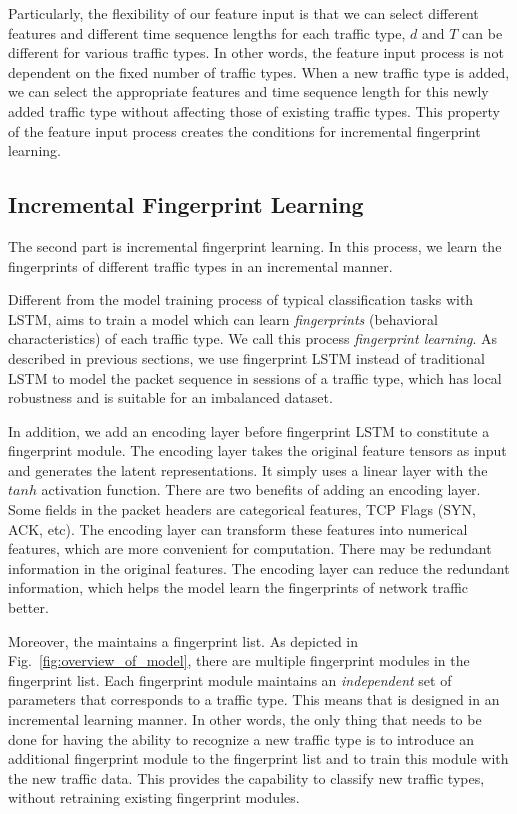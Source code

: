 Particularly, the flexibility of our feature input is that we can select different features and different time sequence lengths for each traffic type, \ie $d$ and $T$ can be different for various traffic types.  
In other words, the feature input process is not dependent on the fixed number of traffic types. 
When a new traffic type is added, we can select the appropriate features and time sequence length for this newly added traffic type without affecting those of existing traffic types.
This property of the feature input process creates the conditions for incremental fingerprint learning.

\subsection{Incremental Fingerprint Learning}
The second part is incremental fingerprint learning. 
In this process, we learn the fingerprints of different traffic types in an incremental manner.

Different from the model training process of typical classification tasks with LSTM, \sys aims to train a model which can learn \emph{fingerprints} (behavioral characteristics) of each traffic type. 
We call this process \emph{fingerprint learning}. 
As described in previous sections, we use fingerprint LSTM instead of traditional LSTM to model the packet sequence in sessions of a traffic type, which has local robustness and is suitable for an imbalanced dataset.

In addition, we add an encoding layer before fingerprint LSTM to constitute a fingerprint module.
The encoding layer takes the original feature tensors as input and generates the latent representations.
It simply uses a linear layer with the $\mathit{tanh}$ activation function.
There are two benefits of adding an encoding layer.
\first Some fields in the packet headers are categorical features, \eg TCP Flags (SYN, ACK, etc). The encoding layer can transform these features into numerical features, which are more convenient for computation.
\second There may be redundant information in the original features. 
The encoding layer can reduce the redundant information, which helps the model learn the fingerprints of network traffic better. 

Moreover, the \sys maintains a fingerprint list. 
As depicted in Fig.~\ref{fig:overview_of_model}, there are multiple fingerprint modules in the fingerprint list. 
Each fingerprint module maintains an \emph{independent} set of parameters that corresponds to a traffic type.
This means that \sys is designed in an incremental learning manner. 
In other words, the only thing that needs to be done for having the ability to recognize a new traffic type is to introduce an additional fingerprint module to the fingerprint list and to train this module with the new traffic data.
This provides \sys the capability to classify new traffic types, without retraining existing fingerprint modules.

